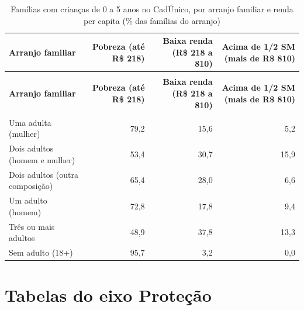 \begin{apendicesenv}
{\small\setlength{\tabcolsep}{5pt}
\begin{longtable}{@{}>{\raggedright\arraybackslash}p{3.6cm}rrr@{}}
\caption{Famílias com crianças de 0 a 5 anos no CadÚnico, por arranjo familiar e renda per capita (\% das famílias do arranjo)}\label{tab:cadunico-familias-arranjo-renda-2026}\\
\toprule \textbf{Arranjo familiar} & \parbox[b]{2.20cm}{\raggedleft{} \textbf{Pobreza (até R\$ 218)}} & \parbox[b]{2.20cm}{\raggedleft{} \textbf{Baixa renda (R\$ 218 a 810)}} & \parbox[b]{2.20cm}{\raggedleft{} \textbf{Acima de 1/2 SM (mais de R\$ 810)}} \\ \midrule \endfirsthead
{}\\ \toprule \textbf{Arranjo familiar} & \parbox[b]{2.20cm}{\raggedleft{} \textbf{Pobreza (até R\$ 218)}} & \parbox[b]{2.20cm}{\raggedleft{} \textbf{Baixa renda (R\$ 218 a 810)}} & \parbox[b]{2.20cm}{\raggedleft{} \textbf{Acima de 1/2 SM (mais de R\$ 810)}} \\ \midrule \endhead
\midrule {}\\ \endfoot
\bottomrule \endlastfoot
Uma adulta (mulher) & 79,2 & 15,6 & 5,2 \\
Dois adultos (homem e mulher) & 53,4 & 30,7 & 15,9 \\
Dois adultos (outra composição) & 65,4 & 28,0 & 6,6 \\
Um adulto (homem) & 72,8 & 17,8 & 9,4 \\
Três ou mais adultos & 48,9 & 37,8 & 13,3 \\
Sem adulto (18+) & 95,7 & 3,2 & 0,0 \\
\end{longtable}}
\vspace{-6pt}


\chapter{Tabelas do eixo Proteção}\label{ap:eixo-4}


\end{apendicesenv}
